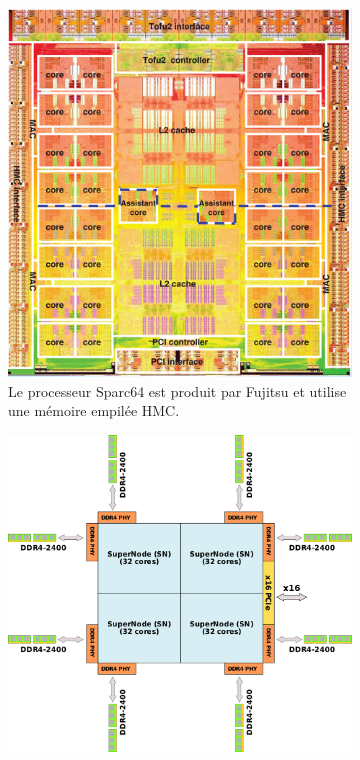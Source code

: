           
        \begin{figure}[t!]
            \centering
            \begin{subfigure}[t]{0.48\textwidth}
                \centering
                \includegraphics[width=0.9\linewidth]{images/edl_sparc64.png}
                \caption{\label{fig:edl_sparc64} Le processeur Sparc64 est produit par Fujitsu et utilise une mémoire empilée HMC\cite{7021857}.}
            \end{subfigure}\hfill
            \begin{subfigure}[t]{0.48\textwidth}
                \centering
                \includegraphics[width=\linewidth]{images/edlp_matrix_2000.png}

\end{subfigure}
\end{figure}
